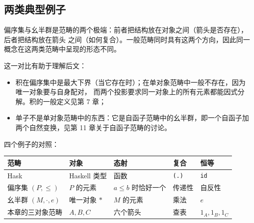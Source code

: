\subsection{两类典型例子}\label{ux4e24ux7c7bux5178ux578bux4f8bux5b50}

偏序集与幺半群是范畴的两个极端：前者把结构放在对象之间（箭头是否存在），后者把结构放在箭头
之间（如何复合）。一般范畴同时具有这两个方向，因此同一概念在这两类范畴中呈现的形态不同。

这一对比有助于理解后文：

\begin{itemize}
\tightlist
\item
  积在偏序集中是最大下界（当它存在时）；在单对象范畴中一般不存在，因为唯一对象要与自身配对，
  而两个投影要求同一对象上的所有元素都能因式分解。积的一般定义见第 7 章；
\item
  单子不是单对象范畴中的东西：它是自函子范畴中的幺半群，即一个自函子加两个自然变换，见第 11
  章关于自函子范畴的讨论。
\end{itemize}

四个例子的对照：

{\def\LTcaptype{none} %
\begin{longtable}[]{@{}
  >{\raggedright\arraybackslash}p{}
  >{\raggedright\arraybackslash}p{}
  >{\raggedright\arraybackslash}p{}
  >{\raggedright\arraybackslash}p{}
  >{\raggedright\arraybackslash}p{}@{}}
\toprule\noalign{}
\begin{minipage}[b]{\linewidth}\raggedright
范畴
\end{minipage} & \begin{minipage}[b]{\linewidth}\raggedright
对象
\end{minipage} & \begin{minipage}[b]{\linewidth}\raggedright
态射
\end{minipage} & \begin{minipage}[b]{\linewidth}\raggedright
复合
\end{minipage} & \begin{minipage}[b]{\linewidth}\raggedright
恒等
\end{minipage} \\
\midrule\noalign{}
\endhead
\bottomrule\noalign{}
\endlastfoot
Hask & Haskell 类型 & 函数 & \passthrough{\lstinline!(.)!} & \passthrough{\lstinline!id!} \\
偏序集 \((P, \leq)\) & \(P\) 的元素 & \(a \le b\) 时恰好一个 & 传递性 & 自反性 \\
幺半群 \((M, \cdot, e)\) & 唯一对象 \(\ast\) & \(M\) 的元素 & 乘法 & \(e\) \\
本章的三对象范畴 & \(A, B, C\) & 六个箭头 & 查表 & \(1_A, 1_B, 1_C\) \\
\end{longtable}
}

